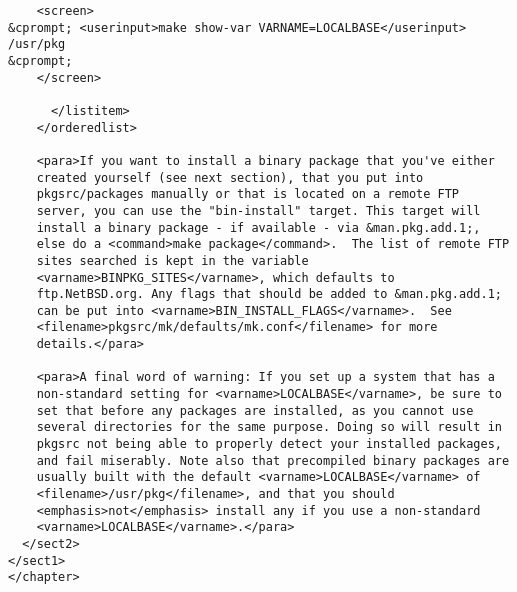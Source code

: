 \begin{verbatim}
	<screen>
&cprompt; <userinput>make show-var VARNAME=LOCALBASE</userinput>
/usr/pkg
&cprompt;
	</screen>

      </listitem>
    </orderedlist>

    <para>If you want to install a binary package that you've either
    created yourself (see next section), that you put into
    pkgsrc/packages manually or that is located on a remote FTP
    server, you can use the "bin-install" target. This target will
    install a binary package - if available - via &man.pkg.add.1;,
    else do a <command>make package</command>.  The list of remote FTP
    sites searched is kept in the variable
    <varname>BINPKG_SITES</varname>, which defaults to
    ftp.NetBSD.org. Any flags that should be added to &man.pkg.add.1;
    can be put into <varname>BIN_INSTALL_FLAGS</varname>.  See
    <filename>pkgsrc/mk/defaults/mk.conf</filename> for more
    details.</para>

    <para>A final word of warning: If you set up a system that has a
    non-standard setting for <varname>LOCALBASE</varname>, be sure to
    set that before any packages are installed, as you cannot use
    several directories for the same purpose. Doing so will result in
    pkgsrc not being able to properly detect your installed packages,
    and fail miserably. Note also that precompiled binary packages are
    usually built with the default <varname>LOCALBASE</varname> of
    <filename>/usr/pkg</filename>, and that you should
    <emphasis>not</emphasis> install any if you use a non-standard
    <varname>LOCALBASE</varname>.</para>
  </sect2>
</sect1>
</chapter>
\end{verbatim}